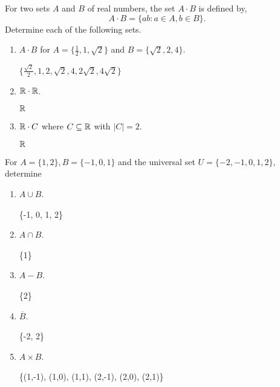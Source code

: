 \documentclass{homework}
\begin{document}
\question For two sets $A$ and $B$ of real numbers, the set $A \cdot B$ is deﬁned by,
\[
    A \cdot B = \{ab: a \in A, b \in B\}.
\]
Determine each of the following sets.
\begin{enumerate}
    \item $A \cdot B$ for $A = \{\frac{1}{2}, 1, \sqrt{2}\}$ and $B = \{\sqrt{2}, 2, 4\}$.

    \begin{sol}
    $\{\frac{\sqrt2}{2}, 1, 2, \sqrt{2}, 4, 2\sqrt{2}, 4\sqrt{2}\}$
    \end{sol}
    
    \item $\mathbb{R} \cdot \mathbb{R}$.

    \begin{sol}
    $\mathbb{R}$
    \end{sol}
    
    \item $\mathbb{R} \cdot C$ where $C \subseteq \mathbb{R}$ with $|C| = 2$.

    \begin{sol}
    $\mathbb{R}$
    
    \end{sol}

\end{enumerate}
\question For $A = \{1, 2\}, B = \{-1, 0, 1\}$ and the universal set $U = \{-2, -1, 0, 1, 2\}$, determine
\begin{enumerate}[label=(\alph*)]
    \item $A \cup B$.

    \begin{sol}
    \{-1, 0, 1, 2\}
    \end{sol}
    
    \item $A \cap B$.

    \begin{sol}
    \{1\}
    \end{sol}
    
    \item $A - B$.

    \begin{sol}
    \{2\}
    \end{sol}
    
    \item $\overline{B}$.

    \begin{sol}
    \{-2, 2\}
    
    \end{sol}
    
    \item $A \times B$.

    \begin{sol}
    \{(1,-1), (1,0), (1,1), (2,-1), (2,0), (2,1)\}
    \end{sol}
\end{enumerate}
\end{document}
